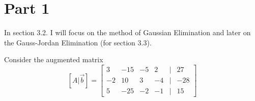 \documentclass{article}
\begin{document}
\newcommand{\hr}{\par\noindent\rule{\textwidth}{0.4pt}}

\newcommand{\bc}[1]{
	\begin{equation*}
		\begin{boxed}
			{#1}
		\end{boxed}
	\end{equation*}
}

\newcommand{\cond}[2]{
	\ifmmode
		{#1} \quad {#2}
	\else
		$$ {#1} \quad {#2} $$
	\fi
}

\tableofcontents

\section{Part 1}
In section 3.2. I will focus on the method of Gaussian Elimination and later on the Gauss-Jordan Elimination (for section 3.3).

Consider the augmented matrix
$$ [A|\vec{b}] =
	\begin{bmatrix}
		3 & -15 & -5 & 2 & | & 27 \\
		-2 & 10 & 3 & -4 & | & -28 \\
		5 & -25 & -2 & -1 & | & 15
	\end{bmatrix}
$$
\end{document}
